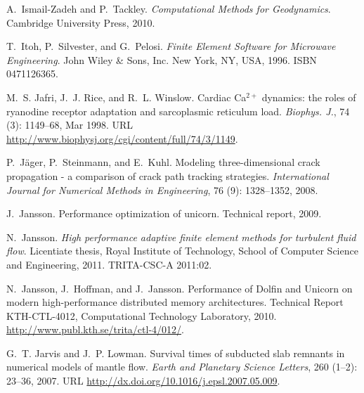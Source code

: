 \begin{thebibliography}{467}
A.~Ismail-Zadeh and P.~Tackley.
\newblock \emph{Computational Methods for Geodynamics}.
\newblock Cambridge University Press, 2010.

T.~Itoh, P.~Silvester, and G.~Pelosi.
\newblock \emph{Finite Element Software for Microwave Engineering}.
\newblock John Wiley \& Sons, Inc. New York, NY, USA, 1996.
\newblock ISBN 0471126365.

M.~S. Jafri, J.~J. Rice, and R.~L. Winslow.
\newblock Cardiac {C}a$^{2+}$ dynamics: the roles of ryanodine receptor
  adaptation and sarcoplasmic reticulum load.
\newblock \emph{Biophys. J.}, 74 (3): 1149--68, Mar 1998.
\newblock URL \url{http://www.biophysj.org/cgi/content/full/74/3/1149}.

P.~J\"ager, P.~Steinmann, and E.~Kuhl.
\newblock Modeling three-dimensional crack propagation - a comparison of crack
  path tracking strategies.
\newblock \emph{International Journal for Numerical Methods in Engineering},
  76 (9): 1328--1352, 2008.

J.~Jansson.
\newblock Performance optimization of unicorn.
\newblock Technical report, 2009.

N.~Jansson.
\newblock \emph{High performance adaptive finite element methods for turbulent
  fluid flow}.
\newblock Licentiate thesis, Royal Institute of Technology, School of Computer
  Science and Engineering, 2011.
\newblock TRITA-CSC-A 2011:02.

N.~Jansson, J.~Hoffman, and J.~Jansson.
\newblock Performance of {D}olfin and {U}nicorn on modern high-performance
  distributed memory architectures.
\newblock Technical Report KTH-CTL-4012, Computational Technology Laboratory,
  2010.
\newblock \url{http://www.publ.kth.se/trita/ctl-4/012/}.

G.~T. Jarvis and J.~P. Lowman.
\newblock Survival times of subducted slab remnants in numerical models of
  mantle flow.
\newblock \emph{Earth and Planetary Science Letters}, 260
  (1--2): 23--36, 2007.
\newblock URL \url{http://dx.doi.org/10.1016/j.epsl.2007.05.009}.


\end{thebibliography}
